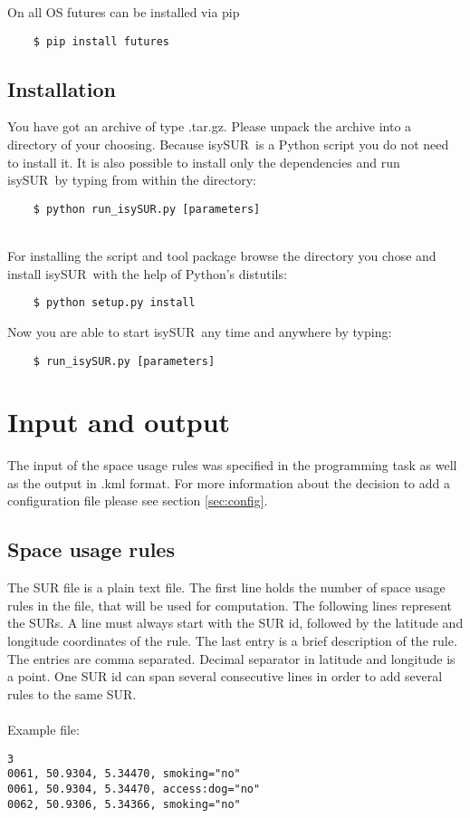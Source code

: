 \documentclass[11pt,fleqn]{book} %
\newcommand{\ProjectTitle}{isySUR}
\newcommand{\pt}{\ProjectTitle}
\begin{document}
\begin{enumerate}
On all OS futures can be installed via pip
\begin{verbatim}
	$ pip install futures
\end{verbatim}
\end{enumerate}

\subsection{Installation} %
You have got an archive of type .tar.gz. Please unpack the archive into a directory of your choosing. Because \pt\ is a Python script you do not need to install it. It is also possible to install only the dependencies and run \pt\ by typing from within the directory: %
\begin{verbatim}
	$ python run_isySUR.py [parameters]
\end{verbatim}
~\\

For installing the script and tool package browse the directory you chose and install \pt\ with the help of Python's distutils:
\begin{verbatim}
	$ python setup.py install
\end{verbatim}
Now you are able to start \pt\ any time and anywhere by typing:
\begin{verbatim}
	$ run_isySUR.py [parameters]
\end{verbatim}

\section{Input and output}\label{sec:io}
The input of the space usage rules was specified in the programming task as well as the output in .kml format. For more information about the decision to add a configuration file please see section \ref{sec:config}.

\subsection{Space usage rules}
The SUR file is a plain text file. The first line holds the number of space usage rules in the file, that will be used for computation. The following lines represent the SURs. A line must always start with the SUR id, followed by the latitude and longitude coordinates of the rule. The last entry is a brief description of the rule. The entries are comma separated. Decimal separator in latitude and longitude is a point. One SUR id can span several consecutive lines in order to add several rules to the same SUR.
\\~\\
Example file:
\begin{verbatim}
3
0061, 50.9304, 5.34470, smoking="no"
0061, 50.9304, 5.34470, access:dog="no"
0062, 50.9306, 5.34366, smoking="no"
\end{verbatim}
\end{document}
